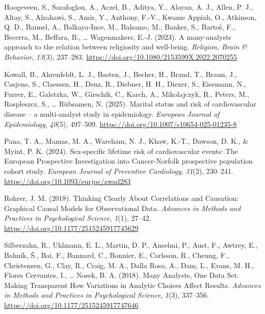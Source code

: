 \documentclass[
  man,
  floatsintext,
  longtable,
  nolmodern,
  notxfonts,
  notimes,
  colorlinks=true,linkcolor=blue,citecolor=blue,urlcolor=blue]{apa7}
\newlength{\cslhangindent}
\newenvironment{CSLReferences}[2] %
 {\begin{list}{}{%
  \setlength{\itemindent}{0pt}
  \setlength{\leftmargin}{0pt}
  \setlength{\parsep}{0pt}
  \ifodd #1
   \setlength{\leftmargin}{\cslhangindent}
   \setlength{\itemindent}{-1\cslhangindent}
  \fi
  \setlength{\itemsep}{#2\baselineskip}}}
 {\end{list}}
\begin{document}
\begin{CSLReferences}{1}{0}
Hoogeveen, S., Sarafoglou, A., Aczel, B., Aditya, Y., Alayan, A. J.,
Allen, P. J., Altay, S., Alzahawi, S., Amir, Y., Anthony, F.-V., Kwame
Appiah, O., Atkinson, Q. D., Baimel, A., Balkaya-Ince, M., Balsamo, M.,
Banker, S., Bartoš, F., Becerra, M., Beffara, B., \ldots{} Wagenmakers,
E.-J. (2023). A many-analysts approach to the relation between
religiosity and well-being. \emph{Religion, Brain \& Behavior},
\emph{13}(3), 237--283.
\url{https://doi.org/10.1080/2153599X.2022.2070255}

Kowall, B., Ahrenfeldt, L. J., Basten, J., Becher, H., Brand, T., Braun,
J., Casjens, S., Claessen, H., Denz, R., Diebner, H. H., Diexer, S.,
Eisemann, N., Furrer, E., Galetzka, W., Girschik, C., Karch, A.,
Mikolajczyk, R., Peters, M., Rospleszcz, S., \ldots{} Rübsamen, N.
(2025). Marital status and risk of cardiovascular disease -- a
multi-analyst study in epidemiology. \emph{European Journal of
Epidemiology}, \emph{40}(5), 497--509.
\url{https://doi.org/10.1007/s10654-025-01235-8}

Pana, T. A., Mamas, M. A., Wareham, N. J., Khaw, K.-T., Dawson, D. K.,
\& Myint, P. K. (2024). Sex-specific lifetime risk of cardiovascular
events: The {European} {Prospective} {Investigation} into
{Cancer}-{Norfolk} prospective population cohort study. \emph{European
Journal of Preventive Cardiology}, \emph{31}(2), 230--241.
\url{https://doi.org/10.1093/eurjpc/zwad283}

Rohrer, J. M. (2018). Thinking {Clearly} {About} {Correlations} and
{Causation}: {Graphical} {Causal} {Models} for {Observational} {Data}.
\emph{Advances in Methods and Practices in Psychological Science},
\emph{1}(1), 27--42. \url{https://doi.org/10.1177/2515245917745629}

Silberzahn, R., Uhlmann, E. L., Martin, D. P., Anselmi, P., Aust, F.,
Awtrey, E., Bahník, Š., Bai, F., Bannard, C., Bonnier, E., Carlsson, R.,
Cheung, F., Christensen, G., Clay, R., Craig, M. A., Dalla Rosa, A.,
Dam, L., Evans, M. H., Flores Cervantes, I., \ldots{} Nosek, B. A.
(2018). Many {Analysts}, {One} {Data} {Set}: {Making} {Transparent}
{How} {Variations} in {Analytic} {Choices} {Affect} {Results}.
\emph{Advances in Methods and Practices in Psychological Science},
\emph{1}(3), 337--356. \url{https://doi.org/10.1177/2515245917747646}


\end{CSLReferences}
\end{document}
